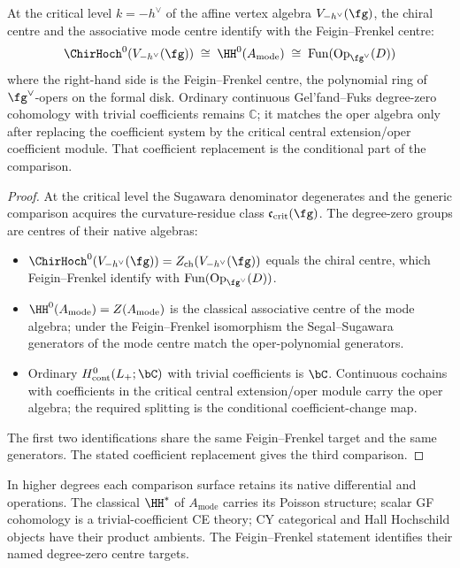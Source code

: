 \begin{theorem}
\label{thm:critical-level-ff-center-unification}
At the critical level $k = -h^\vee$ of the affine vertex algebra
$V_{-h^\vee}(\fg)$, the chiral centre and the associative mode centre
identify with the Feigin--Frenkel centre:
\[
 \ChirHoch^0(V_{-h^\vee}(\fg))
 \;\cong\;
 \HH^0(A_{\mathrm{mode}})
 \;\cong\;
 \mathrm{Fun}(\mathrm{Op}_{\fg^\vee}(D))
\]
where the right-hand side is the Feigin--Frenkel centre, the polynomial
ring of $\fg^\vee$-opers on the formal disk. Ordinary continuous
Gel'fand--Fuks degree-zero cohomology with trivial coefficients remains
$\mathbb C$; it matches the oper algebra only after replacing the
coefficient system by the critical central extension/oper coefficient
module. That coefficient replacement is the conditional part of the
comparison.
\end{theorem}

\begin{proof}
At the critical level the Sugawara denominator degenerates and the
generic comparison acquires the curvature-residue class
$\mathfrak c_{\mathrm{crit}}(\fg)$.  The degree-zero groups are
centres of their native algebras:
\begin{itemize}[nosep]
\item $\ChirHoch^0(V_{-h^\vee}(\fg)) = Z_{\mathrm{ch}}(V_{-h^\vee}(\fg))$
 equals the chiral centre, which Feigin--Frenkel
 \cite{FeFr92,Frenkel07} identify with
 $\mathrm{Fun}(\mathrm{Op}_{\fg^\vee}(D))$.
\item $\HH^0(A_{\mathrm{mode}}) = Z(A_{\mathrm{mode}})$ is the
 classical associative centre of the mode algebra; under the
 Feigin--Frenkel isomorphism the Segal--Sugawara generators of the
 mode centre match the oper-polynomial generators.
\item Ordinary $H^0_{\mathrm{cont}}(L_+;\bC)$ with trivial
 coefficients is $\bC$. Continuous cochains with coefficients in the
 critical central extension/oper module carry the oper algebra; the
 required splitting is the conditional coefficient-change map.
\end{itemize}
The first two identifications share the same Feigin--Frenkel target and
the same generators. The stated coefficient replacement gives the
third comparison.
\end{proof}

\begin{remark}
\label{rem:ff-unification-degree-zero-only}
In higher degrees each comparison surface retains its native
differential and operations. The classical $\HH^*$ of
$A_{\mathrm{mode}}$ carries its Poisson structure; scalar GF
cohomology is a trivial-coefficient CE theory; CY categorical and Hall
Hochschild objects have their product ambients. The Feigin--Frenkel
statement identifies their named degree-zero centre targets.
\end{remark}

